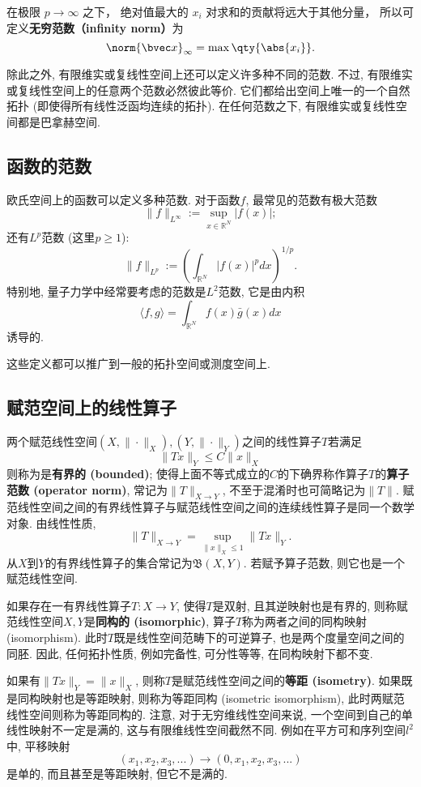在极限 $p \to \infty$ 之下， 绝对值最大的 $x_i$ 对求和的贡献将远大于其他分量， 所以可定义\textbf{无穷范数（infinity norm）}为
\begin{equation}
\norm{\bvec x}_\infty = \max \qty{\abs{x_i}}.
\end{equation}

除此之外, 有限维实或复线性空间上还可以定义许多种不同的范数. 不过, 有限维实或复线性空间上的任意两个范数必然彼此等价. 它们都给出空间上唯一的一个自然拓扑 (即使得所有线性泛函均连续的拓扑). 在任何范数之下, 有限维实或复线性空间都是巴拿赫空间.

\subsection{函数的范数}
欧氏空间上的函数可以定义多种范数. 对于函数$f$, 最常见的范数有极大范数
$$
\|f\|_{L^\infty}:=\sup_{x\in\mathbb{R}^N}|f(x)|;
$$
还有$L^p$范数 (这里$p\geq1$):
$$
\|f\|_{L^p}:=\left(\int_{\mathbb{R}^N}|f(x)|^pdx\right)^{1/p}.
$$
特别地, 量子力学中经常要考虑的范数是$L^2$范数, 它是由内积
$$
\langle f,g\rangle=\int_{\mathbb{R}^N}f(x)\bar g(x)dx
$$
诱导的.

这些定义都可以推广到一般的拓扑空间或测度空间上.

\subsection{赋范空间上的线性算子}
两个赋范线性空间$(X,\|\cdot\|_X),(Y,\|\cdot\|_Y)$之间的线性算子$T$若满足
$$
\|Tx\|_Y\leq C\|x\|_X
$$
则称为是\textbf{有界的 (bounded)}; 使得上面不等式成立的$C$的下确界称作算子$T$的\textbf{算子范数 (operator norm)}, 常记为$\|T\|_{X\to Y}$, 不至于混淆时也可简略记为$\|T\|$. 赋范线性空间之间的有界线性算子与赋范线性空间之间的连续线性算子是同一个数学对象. 由线性性质,
$$
\|T\|_{X\to Y}=\sup_{\|x\|_X\leq 1}\|Tx\|_Y.
$$
从$X$到$Y$的有界线性算子的集合常记为$\mathfrak{B}(X,Y)$. 若赋予算子范数, 则它也是一个赋范线性空间.

如果存在一有界线性算子$T:X\to Y$, 使得$T$是双射, 且其逆映射也是有界的, 则称赋范线性空间$X,Y$是\textbf{同构的 (isomorphic)}, 算子$T$称为两者之间的同构映射 (isomorphism). 此时$T$既是线性空间范畴下的可逆算子, 也是两个度量空间之间的同胚. 因此, 任何拓扑性质, 例如完备性, 可分性等等, 在同构映射下都不变. 

如果有$\|Tx\|_Y=\|x\|_X$, 则称$T$是赋范线性空间之间的\textbf{等距 (isometry)}. 如果既是同构映射也是等距映射, 则称为等距同构 (isometric isomorphism), 此时两赋范线性空间则称为等距同构的. 注意, 对于无穷维线性空间来说, 一个空间到自己的单线性映射不一定是满的, 这与有限维线性空间截然不同. 例如在平方可和序列空间$l^2$中, 平移映射
$$
(x_1,x_2,x_3,...)\to(0,x_1,x_2,x_3,...)
$$
是单的, 而且甚至是等距映射, 但它不是满的.

